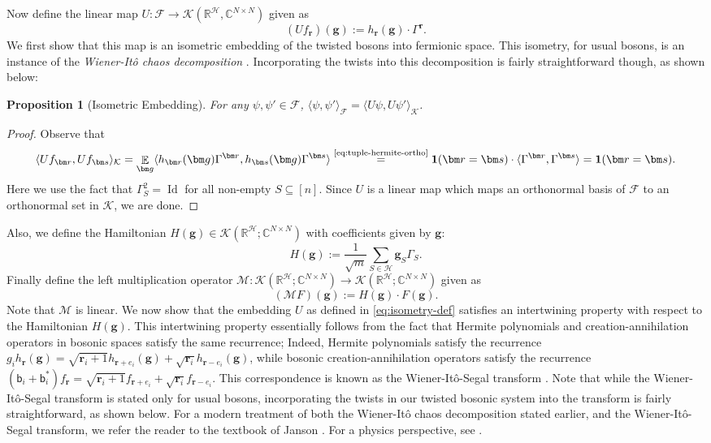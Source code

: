 \documentclass
[11pt,letterpaper]
{article}
\newtheorem{proposition}[theorem]{Proposition}
\theoremstyle{definition}
\newcommand{\sfb}{\mathsf b}
\newcommand{\R}{{\mathbb R}}
\newcommand{\cF}{{\mathcal F}}
\newcommand{\1}{\mathbf{1}}
\newcommand{\C}{\mathbb C}
\newcommand{\cH}{\mathcal H}
\newcommand{\Id}{\operatorname{Id}}
\newcommand{\seq}{\subseteq}
\DeclareMathOperator*{\E}{\mathbb{E}}
\newcommand{\cK}{\mathcal K}
\newcommand{\cM}{\mathcal M}
\begin{document}
Now define the linear map $U:\cF\to\cK(\R^\cH, \C^{N\times N})$ given as 
\begin{equation}\label{eq:isometry-def}
    \left(Uf_{\bm r}\right)(\bm g):= h_{\bm r}(\bm g)\cdot\Gamma^{\bm r}.
\end{equation}
We first show that this map is an isometric embedding of the twisted bosons into fermionic space. This isometry, for usual bosons, is an instance of the \emph{Wiener-It\^o chaos decomposition} \cite{Wiener38,Ito51}. Incorporating the twists into this decomposition is fairly straightforward though, as shown below:
\begin{proposition}[Isometric Embedding]\label{prop:isometry}
    For any $\psi, \psi'\in\cF$, $\langle\psi, \psi'\rangle_\cF = \langle U\psi, U\psi'\rangle_{\cK}$.
\end{proposition}
\begin{proof}
    Observe that 
\[\langle Uf_{\bm r}, Uf_{\bm s}\rangle_{\cK} = \E_{\bm g}\langle h_{\bm r}(\bm g)\Gamma^{\bm r}, h_{\bm s}(\bm g)\Gamma^{\bm s}\rangle\overset{\text{\cref{eq:tuple-hermite-ortho}}}{=}\1(\bm r = \bm s)\cdot\langle\Gamma^{\bm r}, \Gamma^{\bm s}\rangle = \1(\bm r = \bm s).\]
Here we use the fact that $\Gamma_S^2 = \Id$ for all non-empty $S\seq[n]$. Since $U$ is a linear map which maps an orthonormal basis of $\cF$ to an orthonormal set in $\cK$, we are done.
\end{proof}
Also, we define the Hamiltonian $H(\bm g)\in\cK(\R^\cH;\C^{N\times N})$ with coefficients given by $\bm g$:
\[H(\bm g):= \frac{1}{\sqrt{m}}\sum_{S\in\cH}\bm g_S\Gamma_S.\]
Finally define the left multiplication operator $\cM :\cK(\R^\cH;\C^{N\times N})\to\cK(\R^\cH;\C^{N\times N})$ given as
\[(\cM F)(\bm g):= H(\bm g)\cdot F(\bm g).\]
Note that $\cM $ is linear. We now show that the embedding $U$ as defined in \cref{eq:isometry-def} satisfies an intertwining property with respect to the Hamiltonian $H(\bm g)$. This intertwining property essentially follows from the fact that Hermite polynomials and creation-annihilation operators in bosonic spaces satisfy the same recurrence; Indeed, Hermite polynomials satisfy the recurrence $g_ih_{\bm r}(\bm g) = \sqrt{\bm r_i + 1}h_{\bm r + e_i}(\bm g) + \sqrt{\bm r_i}h_{\bm r - e_i}(\bm g)$, while bosonic creation-annihilation operators satisfy the recurrence $(\sfb_i + \sfb^*_i)f_{\bm r} = \sqrt{\bm r_i + 1}f_{\bm r + e_i} + \sqrt{\bm r_i}f_{\bm r - e_i}$. This correspondence is known as the Wiener-It\^o-Segal transform \cite{Wiener38,Ito51,Segal56}. Note that while the Wiener-It\^o-Segal transform is stated only for usual bosons, incorporating the twists in our twisted bosonic system into the transform is fairly straightforward, as shown below. For a modern treatment of both the Wiener-It\^o chaos decomposition stated earlier, and the Wiener-It\^o-Segal transform, we refer the reader to the textbook of Janson \cite{Janson97}. For a physics perspective, see \cite[Chapter~1]{Simons74}.
\end{document}
